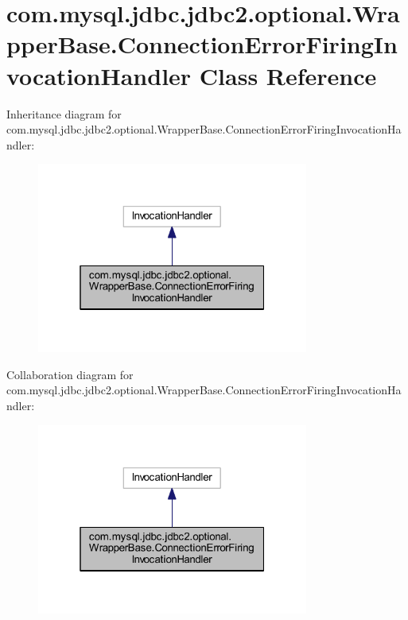 \hypertarget{classcom_1_1mysql_1_1jdbc_1_1jdbc2_1_1optional_1_1_wrapper_base_1_1_connection_error_firing_invocation_handler}{}\section{com.\+mysql.\+jdbc.\+jdbc2.\+optional.\+Wrapper\+Base.\+Connection\+Error\+Firing\+Invocation\+Handler Class Reference}
\label{classcom_1_1mysql_1_1jdbc_1_1jdbc2_1_1optional_1_1_wrapper_base_1_1_connection_error_firing_invocation_handler}


Inheritance diagram for com.\+mysql.\+jdbc.\+jdbc2.\+optional.\+Wrapper\+Base.\+Connection\+Error\+Firing\+Invocation\+Handler\+:
\nopagebreak
\begin{figure}[H]
\begin{center}
\leavevmode
\includegraphics[width=253pt]{classcom_1_1mysql_1_1jdbc_1_1jdbc2_1_1optional_1_1_wrapper_base_1_1_connection_error_firing_invocation_handler__inherit__graph}
\end{center}
\end{figure}


Collaboration diagram for com.\+mysql.\+jdbc.\+jdbc2.\+optional.\+Wrapper\+Base.\+Connection\+Error\+Firing\+Invocation\+Handler\+:
\nopagebreak
\begin{figure}[H]
\begin{center}
\leavevmode
\includegraphics[width=253pt]{classcom_1_1mysql_1_1jdbc_1_1jdbc2_1_1optional_1_1_wrapper_base_1_1_connection_error_firing_invocation_handler__coll__graph}
\end{center}
\end{figure}
